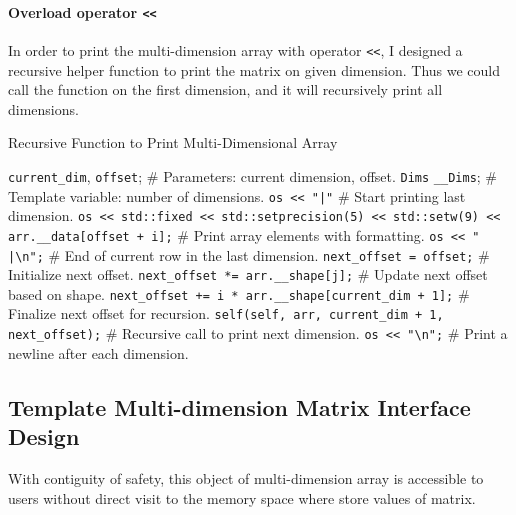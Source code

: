 \paragraph{Overload operator \texttt{<<}}
In order to print the multi-dimension array with operator \texttt{<<}, I designed a recursive helper function
to print the matrix on given dimension. Thus we could call the function on the first dimension, and it will 
recursively print all dimensions.
\begin{algorithm}
  \caption{Recursive Function to Print Multi-Dimensional Array}
  \begin{algorithmic}[1]
    \STATE \texttt{current\_dim}, \texttt{offset};               \hfill \# Parameters: current dimension, offset.
    \STATE \texttt{Dims} \texttt{\_\_Dims};                       \hfill \# Template variable: number of dimensions.
      \STATE \texttt{os << "|"}                                   \hfill \# Start printing last dimension.
        \STATE \texttt{os << std::fixed << std::setprecision(5) << std::setw(9) << arr.\_\_data[offset + i];} \hfill \# Print array elements with formatting.
      \ENDFOR
      \STATE \texttt{os << " |\textbackslash n";}                  \hfill \# End of current row in the last dimension.
    \ELSE
        \STATE \texttt{next\_offset = offset;}                      \hfill \# Initialize next offset.
          \STATE \texttt{next\_offset *= arr.\_\_shape[j];}          \hfill \# Update next offset based on shape.
        \ENDFOR
        \STATE \texttt{next\_offset += i * arr.\_\_shape[current\_dim + 1];} \hfill \# Finalize next offset for recursion.
        \STATE \texttt{self(self, arr, current\_dim + 1, next\_offset);} \hfill \# Recursive call to print next dimension.
      \ENDFOR
      \STATE \texttt{os << "\textbackslash n";}                     \hfill \# Print a newline after each dimension.
    \ENDIF
  \end{algorithmic}
\end{algorithm}



\subsection{Template Multi-dimension Matrix Interface Design}
With contiguity of safety, this object of multi-dimension array is accessible to users without 
direct visit to the memory space where store values of matrix.

